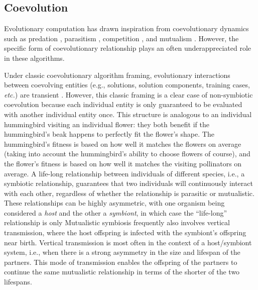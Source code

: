 \subsection{Coevolution}
\label{sec:coevolution}

Evolutionary computation has drawn inspiration from coevolutionary dynamics such as predation \citep{willkens2022evolving,popovici2012coevolutionary, ficici2000gametheoretic}, parasitism \citep{hillis1990coevolving,cliff1995tracking}, competition \citep{stanley2004competitive}, and mutualism \citep{wang2019paired, bucci2005identifying, bucci2003mathematical, bucci2003focusing, watson2003computational, watson2001coevolutionary}.
However, the specific form of coevolutionary relationship plays an often underappreciated role in these algorithms.

Under classic coevolutionary algorithm framing, evolutionary interactions between coevolving entities (e.g., solutions, solution components, training cases, \textit{etc.}) are transient \citep{potter2000cooperative,ma2018survey, pan2022effective, gong2015distributed, goh2009competitivecooperative, antonio2017coevolutionary,hancer2025survey, wiegand2004analysis, garciapedrajas2005cooperative, wiegand2001empirical, byrski2015evolutionary}.
However, this classic framing is a clear case of non-symbiotic coevolution because each individual entity is only guaranteed to be evaluated with another individual entity once. %
This structure is analogous to an individual hummingbird visiting an individual flower: they both benefit if the hummingbird's beak happens to perfectly fit the flower's shape.
The hummingbird's fitness is based on how well it matches the flowers on average (taking into account the hummingbird's ability to choose flowers of course), and the flower's fitness is based on how well it matches the visiting pollinators on average.
A life-long relationship between individuals of different species, i.e., a symbiotic relationship, guarantees that two individuals will continuously interact with each other, regardless of whether the relationship is parasitic or mutualistic.
These relationships can be highly asymmetric, with one organism being considered a \textit{host} and the other a \textit{symbiont}, in which case the ``life-long'' relationship is only
Mutualistic symbiosis frequently also involves vertical transmission, where the host offspring is infected with the symbiont's offspring near birth.
Vertical transmission is most often in the context of a host/symbiont system, i.e., when there is a strong asymmetry in the size and lifespan of the partners.
This mode of transmission enables the offspring of the partners to continue the same mutualistic relationship in terms of the shorter of the two lifespans.


